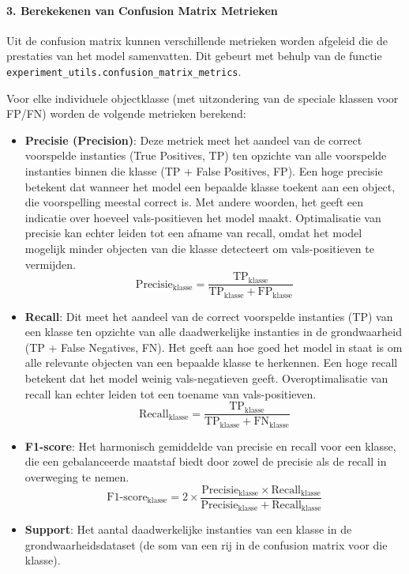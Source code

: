\paragraph{3. Berekekenen van Confusion Matrix Metrieken}
Uit de confusion matrix kunnen verschillende metrieken worden afgeleid die de prestaties van het model samenvatten.
Dit gebeurt met behulp van de functie \texttt{experiment\_utils.confusion\_matrix\_metrics}. 

Voor elke individuele objectklasse (met uitzondering van de speciale klassen voor FP/FN) worden de volgende metrieken berekend:
\begin{itemize}
    \item \textbf{Precisie (Precision)}: Deze metriek meet het aandeel van de correct voorspelde instanties (True Positives, TP) 
        ten opzichte van alle voorspelde instanties binnen die klasse (TP + False Positives, FP). 
        Een hoge precisie betekent dat wanneer het model een bepaalde klasse toekent aan een object, die voorspelling meestal correct is. 
        Met andere woorden, het geeft een indicatie over hoeveel vals-positieven het model maakt. 
        Optimalisatie van precisie kan echter leiden tot een afname van recall,
        omdat het model mogelijk minder objecten van die klasse detecteert om vals-positieven te vermijden.
        \[
        \text{Precisie}_{\text{klasse}} = \frac{\text{TP}_{\text{klasse}}}{\text{TP}_{\text{klasse}} + \text{FP}_{\text{klasse}}}
        \]
    \item \textbf{Recall}: Dit meet het aandeel van de correct voorspelde instanties (TP) 
        van een klasse ten opzichte van alle daadwerkelijke instanties in de grondwaarheid (TP + False Negatives, FN). 
        Het geeft aan hoe goed het model in staat is om alle relevante objecten van een bepaalde klasse te herkennen.
        Een hoge recall betekent dat het model weinig vals-negatieven geeft.
        Overoptimalisatie van recall kan echter leiden tot een toename van vals-positieven.
        \[
        \text{Recall}_{\text{klasse}} = \frac{\text{TP}_{\text{klasse}}}{\text{TP}_{\text{klasse}} + \text{FN}_{\text{klasse}}}
        \]
    \item \textbf{F1-score}: Het harmonisch gemiddelde van precisie en recall voor een klasse, 
    die een gebalanceerde maatstaf biedt door zowel de precisie als de recall in overweging te nemen.
    \[
    \text{F1-score}_{\text{klasse}} = 2 \times \frac{\text{Precisie}_{\text{klasse}} \times \text{Recall}_{\text{klasse}}}{\text{Precisie}_{\text{klasse}} + \text{Recall}_{\text{klasse}}}
    \]
    \item \textbf{Support}: Het aantal daadwerkelijke instanties van een klasse in de grondwaarheidsdataset (de som van een rij in de confusion matrix voor die klasse).
\end{itemize}

